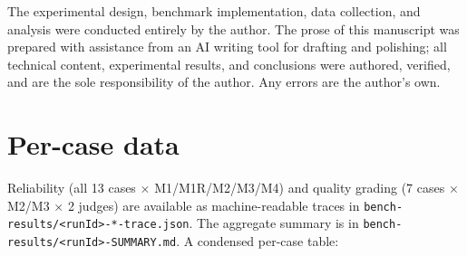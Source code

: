 \documentclass[11pt]{article}
\begin{document}
The experimental design, benchmark implementation, data collection, and
analysis were conducted entirely by the author. The prose of this manuscript
was prepared with assistance from an AI writing tool for drafting and
polishing; all technical content, experimental results, and conclusions were
authored, verified, and are the sole responsibility of the author. Any errors
are the author's own.

\appendix
\section{Per-case data}

Reliability (all 13 cases $\times$ M1/M1R/M2/M3/M4) and quality grading (7 cases
$\times$ M2/M3 $\times$ 2 judges) are available as machine-readable traces in
\verb|bench-results/<runId>-*-trace.json|. The aggregate summary is in
\verb|bench-results/<runId>-SUMMARY.md|. A condensed per-case table:
\end{document}
